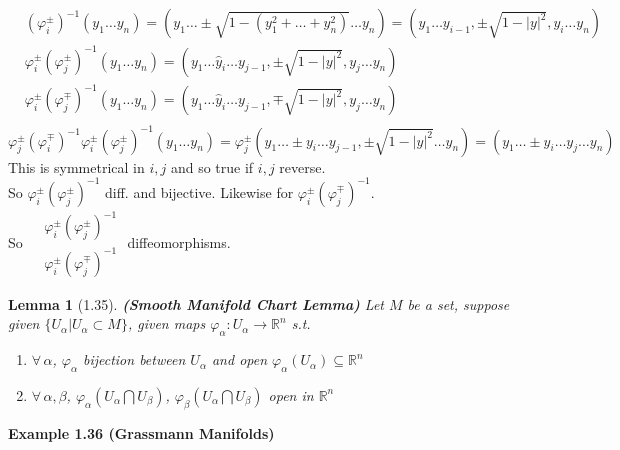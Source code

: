 \documentclass[11pt]{amsart}
\newtheorem{lemma}{Lemma}
\theoremstyle{definition}
\begin{document}
\[
\begin{aligned}
  & (\varphi_i^{\pm})^{-1}(y_1 \dots y_n) = (y_1 \dots \pm \sqrt{ 1 - (y_1^2 + \dots + y_n^2) } \dots y_n) = (y_1 \dots y_{i-1}, \pm \sqrt{ 1-  |y|^2 }, y_i\dots y_n ) \\
 & \varphi_i^{\pm} (\varphi_j^{\pm})^{-1}(y_1 \dots y_n ) = (y_1 \dots \widehat{y}_i \dots y_{j-1} , \pm \sqrt{ 1 - |y|^2 }, y_j \dots y_n) \\
 & \varphi_i^{\pm} (\varphi_j^{\mp})^{-1}(y_1 \dots y_n ) = (y_1 \dots \widehat{y}_i \dots y_{j-1} , \mp \sqrt{ 1 - |y|^2 }, y_j \dots y_n) \\
\end{aligned}
\]
\[
\varphi_j^{\pm}(\varphi_i^{\mp})^{-1} \varphi_i^{\pm} (\varphi_j^{\pm})^{-1}(y_1 \dots y_n) = \varphi_j^{\pm}(y_1 \dots \pm y_i \dots y_{j-1}, \pm \sqrt{ 1 - |y|^2 } \dots y_n ) = (y_1 \dots \pm y_i \dots y_j \dots y_n)
\]
This is symmetrical in $i,j$ and so true if $i,j$ reverse.  \\

So $\varphi_i^{\pm}(\varphi_j^{\pm})^{-1}$ diff. and bijective.  Likewise for $\varphi_i^{\pm}(\varphi_j^{\mp})^{-1}$.  \\
So $\begin{aligned} & \varphi_i^{\pm} (\varphi_j^{\pm})^{-1} \\
  & \varphi_i^{\pm} (\varphi_j^{\mp})^{-1} \end{aligned}$ diffeomorphisms.

\begin{lemma}[1.35] \textbf{(Smooth Manifold Chart Lemma)}
Let $M$ be a set, suppose given $\lbrace U_{\alpha} | U_{\alpha} \subset M \rbrace$, given maps $\varphi_{\alpha}: U_{\alpha} \to \mathbb{R}^n$ s.t.
\begin{enumerate}
\item[(i)] $\forall \, \alpha$, $\varphi_{\alpha}$ bijection between $U_{\alpha}$ and open $\varphi_{\alpha}(U_{\alpha}) \subseteq \mathbb{R}^n$
\item[(ii)] $\forall \, \alpha, \beta$, $\varphi_{\alpha}(U_{\alpha} \bigcap U_{\beta})$, $\varphi_{\beta}(U_{\alpha} \bigcap U_{\beta})$ open in $\mathbb{R}^n$
\end{enumerate}
\end{lemma}


\textbf{Example 1.36 (Grassmann Manifolds)}


\end{document}
